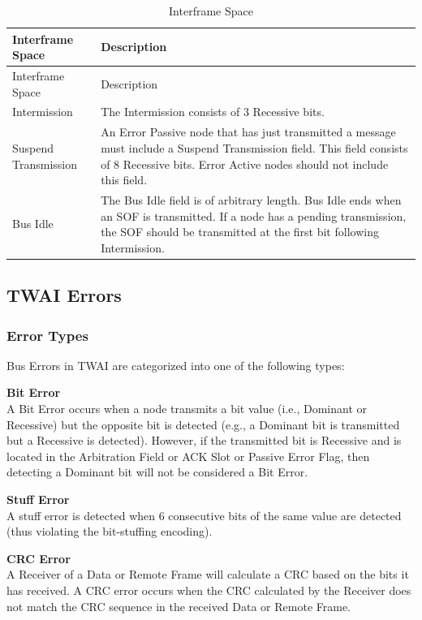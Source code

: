 \documentclass[main\_\_EN.tex]{subfiles}
\begin{document}
\begin{longtable}[c]{|p{4cm}|p{11cm}|}
  \caption{Interframe Space}
  \label{table:Interframe_space}
  \\\hline
  \rowcolor{lightgray}
  Interframe Space & Description
  \\\hline
  \endfirsthead

  \hline
  \rowcolor{lightgray}
   Interframe Space & Description
   \\\hline
  \endhead
  \endfoot
  \hline
  \endlastfoot

    Intermission & The Intermission consists of 3 Recessive bits.
           \\\hline
    Suspend Transmission & An Error Passive node that has just transmitted a message must include a Suspend Transmission field. This field consists of 8 Recessive bits. Error Active nodes should not include this field.
            \\\hline
    Bus Idle & The Bus Idle field is of arbitrary length. Bus Idle ends when an SOF is transmitted. If a node has a pending transmission, the SOF should be transmitted at the first bit following Intermission.
             \\\hline
    \end{longtable}

\subsection{TWAI Errors}
\label{subsubsec:twai-errors}
\subsubsection{Error Types}

Bus Errors in TWAI are categorized into one of the following types:

{\bfseries Bit Error}\\
A Bit Error occurs when a node transmits a bit value (i.e., Dominant or Recessive) but the opposite bit is detected (e.g., a Dominant bit is transmitted but a Recessive is detected). However, if the transmitted bit is Recessive and is located in the Arbitration Field or ACK Slot or Passive Error Flag, then detecting a Dominant bit will not be considered a Bit Error.


{\bfseries Stuff Error}\\
A stuff error is detected when 6 consecutive bits of the same value are detected (thus violating the bit-stuffing encoding).

{\bfseries CRC Error}\\
A Receiver of a Data or Remote Frame will calculate a CRC based on the bits it has received. A CRC error occurs when the CRC calculated by the Receiver does not match the CRC sequence in the received Data or Remote Frame.
\end{document}
